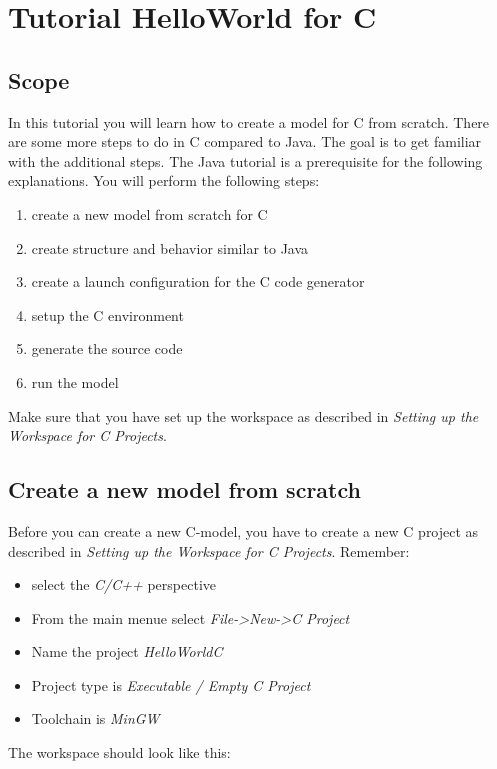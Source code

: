 \chapter{Tutorial HelloWorld for C}

\section{Scope}

In this tutorial you will learn how to create a model for C from scratch. There are some more steps to do 
in C compared to Java. The goal is to get familiar with the additional steps. The Java tutorial is a 
prerequisite for the following explanations. 
You will perform the following steps:

\begin{enumerate}
\item create a new model from scratch for C
\item create structure and behavior similar to Java
\item create a launch configuration for the C code generator
\item setup the C environment
\item generate the source code
\item run the model
\end{enumerate}

Make sure that you have set up the workspace as described in \textit{Setting up the Workspace for C 
Projects}.


\section{Create a new model from scratch}

Before you can create a new C-model, you have to create a new C project as described in \textit{Setting up 
the Workspace for C Projects}.
Remember:
\begin{itemize}
\item select the \textit{C/C++} perspective
\item From the main menue select \textit{File->New->C Project}
\item Name the project \textit{HelloWorldC}
\item Project type is \textit{Executable / Empty C Project}
\item Toolchain is \textit{MinGW}
\end{itemize}

The workspace should look like this:

